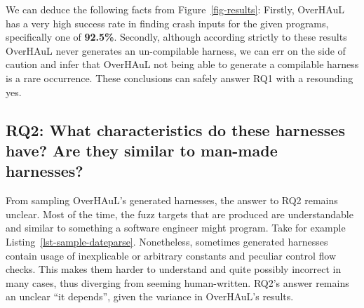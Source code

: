 \documentclass[
  a4paper,
]{scrreprt}
\theoremstyle{definition}
\theoremstyle{remark}
\begin{document}
We can deduce the following facts from Figure~\ref{fig-results}:
Firstly, OverHAuL has a very high success rate in finding crash inputs
for the given programs, specifically one of \textbf{92.5\%}. Secondly,
although according strictly to these results OverHAuL never generates an
un-compilable harness, we can err on the side of caution and infer that
OverHAuL not being able to generate a compilable harness is a rare
occurrence. These conclusions can safely answer RQ1 with a resounding
yes.

\subsection{RQ2: What characteristics do these harnesses have? Are they
similar to man-made
harnesses?}\label{rq2-what-characteristics-do-these-harnesses-have-are-they-similar-to-man-made-harnesses}

From sampling OverHAuL's generated harnesses, the answer to RQ2 remains
unclear. Most of the time, the fuzz targets that are produced are
understandable and similar to something a software engineer might
program. Take for example Listing~\ref{lst-sample-dateparse}.
Nonetheless, sometimes generated harnesses contain usage of inexplicable
or arbitrary constants and peculiar control flow checks. This makes them
harder to understand and quite possibly incorrect in many cases, thus
diverging from seeming human-written. RQ2's answer remains an unclear
``it depends'', given the variance in OverHAuL's results.
\end{document}
